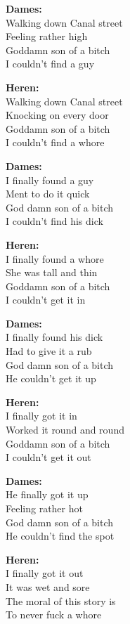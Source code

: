 
\textbf{Dames:}\\
Walking down Canal street\\
Feeling rather high\\
Goddamn son of a bitch\\
I couldn’t find a guy

\textbf{Heren:}\\
Walking down Canal street\\
Knocking on every door\\
Goddamn son of a bitch\\
I couldn't find a whore

\textbf{Dames:}\\
I finally found a guy\\ 
Ment to do it quick\\
God damn son of a bitch\\
I couldn’t find his dick

\textbf{Heren:}\\
I finally found a whore\\
She was tall and thin\\
Goddamn son of a bitch\\
I couldn't get it in

\textbf{Dames:}\\
I finally found his dick\\
Had to give it a rub\\
God damn son of a bitch\\
He couldn’t get it up

\textbf{Heren:}\\
I finally got it in\\
Worked it round and round\\
Goddamn son of a bitch\\
I couldn't get it out

\textbf{Dames:}\\
He finally got it up\\
Feeling rather hot\\
God damn son of a bitch\\
He couldn’t find the spot

\textbf{Heren:}\\
I finally got it out\\
It was wet and sore\\
The moral of this story is\\
To never fuck a whore
